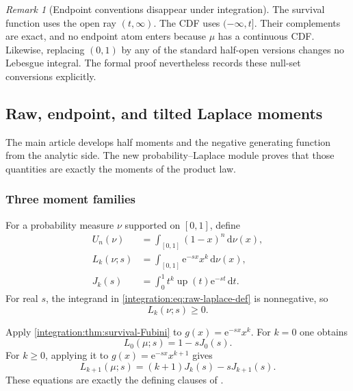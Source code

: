 \documentclass[11pt,oneside]{article}
\theoremstyle{definition}
\theoremstyle{remark}
\newtheorem{remark}[theorem]{Remark}
\newcommand{\Up}{\operatorname{up}}
\newcommand{\e}{\mathrm e}
\newcommand{\dd}{\,\mathrm d}
\begin{document}
\begin{remark}[Endpoint conventions disappear under integration]
The survival function uses the open ray $(t,\infty)$.  The CDF uses $(-\infty,t]$.  Their
complements are exact, and no endpoint atom enters because $\mu$ has a continuous CDF.
Likewise, replacing $(0,1)$ by any of the standard half-open versions changes no Lebesgue
integral.  The formal proof nevertheless records these null-set conversions explicitly.
\end{remark}

\subsection{Raw, endpoint, and tilted Laplace moments}
\label{integration:sec:probability-laplace}

The main article develops half moments and the negative generating function from the
analytic side.  The new probability--Laplace module proves that those quantities are exactly
the moments of the product law.

\subsubsection{Three moment families}

For a probability measure $\nu$ supported on $[0,1]$, define
\begin{align}
 U_n(\nu)&=\int_{[0,1]}(1-x)^n\dd\nu(x),                  \label{integration:eq:endpoint-moment-def}\\
 L_k(\nu;s)&=\int_{[0,1]}\e^{-sx}x^k\dd\nu(x),           \label{integration:eq:raw-laplace-def}\\
 J_k(s)&=\int_0^1t^k\Up(t)\e^{-st}\dd t.                 \label{integration:eq:survival-tilt-def}
\end{align}
For real $s$, the integrand in \eqref{integration:eq:raw-laplace-def} is nonnegative, so
\begin{equation}
 L_k(\nu;s)\ge0.
 \label{integration:eq:laplace-moment-nonnegative}
\end{equation}

Apply \cref{integration:thm:survival-Fubini} to $g(x)=\e^{-sx}x^k$.  For $k=0$ one obtains
\begin{equation}
 L_0(\mu;s)=1-sJ_0(s).
 \label{integration:eq:laplace-zero-survival}
\end{equation}
For $k\ge0$, applying it to $g(x)=\e^{-sx}x^{k+1}$ gives
\begin{equation}
 L_{k+1}(\mu;s)=(k+1)J_k(s)-sJ_{k+1}(s).
 \label{integration:eq:laplace-successor-survival}
\end{equation}
These equations are exactly the defining clauses of
.
\end{document}

